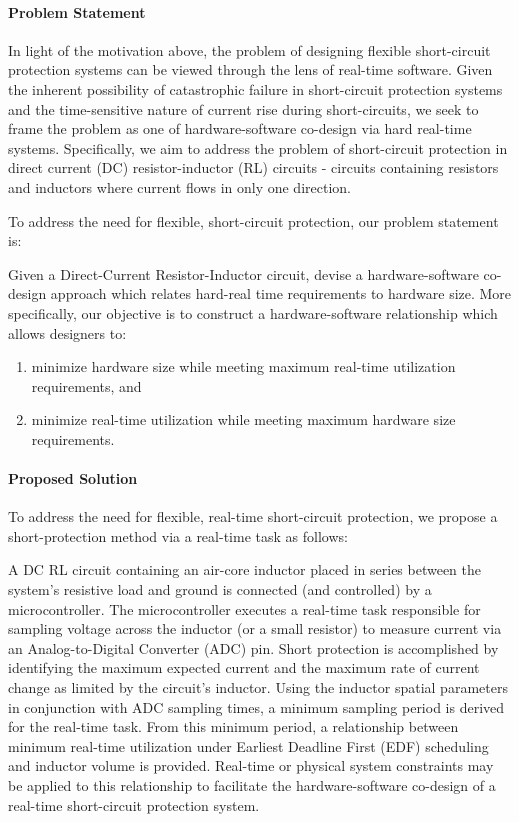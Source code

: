\paragraph{Problem Statement}
In light of the motivation above, the problem of designing flexible short-circuit protection systems can be viewed through the lens of real-time software.
Given the inherent possibility of catastrophic failure in short-circuit protection systems and the time-sensitive nature of current rise during short-circuits, we seek to frame the problem as one of hardware-software co-design via hard real-time systems.
Specifically, we aim to address the problem of short-circuit protection in direct current (DC) resistor-inductor (RL) circuits - circuits containing resistors and inductors where current flows in only one direction.

To address the need for flexible, short-circuit protection, our problem statement is:

\noindent Given a Direct-Current Resistor-Inductor circuit, devise a hardware-software co-design approach which relates hard-real time requirements to hardware size. More specifically, our objective is to construct a hardware-software relationship which allows designers to:
\begin{enumerate}
    \item minimize hardware size while meeting maximum real-time utilization requirements, and
    \item minimize real-time utilization while meeting maximum hardware size requirements.
\end{enumerate}

\paragraph{Proposed Solution}
To address the need for flexible, real-time short-circuit protection, we propose a short-protection method via a real-time task as follows:

A DC RL circuit containing an air-core inductor placed in series between the system's resistive load and ground is connected (and controlled) by a microcontroller.
The microcontroller executes a real-time task responsible for sampling voltage across the inductor (or a small resistor) to measure current via an Analog-to-Digital Converter (ADC) pin.
Short protection is accomplished by identifying the maximum expected current and the maximum rate of current change as limited by the circuit's inductor.
Using the inductor spatial parameters in conjunction with ADC sampling times, a minimum sampling period is derived for the real-time task.
From this minimum period, a relationship between minimum real-time utilization under Earliest Deadline First (EDF) scheduling and inductor volume is provided.
Real-time or physical system constraints may be applied to this relationship to facilitate the hardware-software co-design of a real-time short-circuit protection system.

